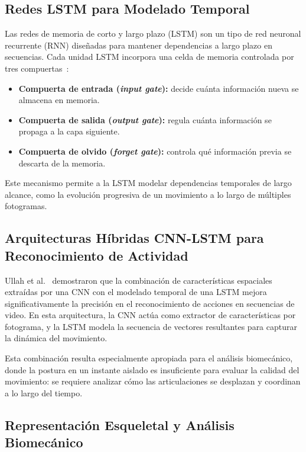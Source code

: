 \documentclass[conference]{IEEEtran}
\begin{document}
\subsection{Redes LSTM para Modelado Temporal}

Las redes de memoria de corto y largo plazo (LSTM) son un tipo de
red neuronal recurrente (RNN) diseñadas para mantener dependencias
a largo plazo en secuencias. Cada unidad LSTM incorpora una celda
de memoria controlada por tres compuertas~\cite{ullah2018action}:

\begin{itemize}
  \item \textbf{Compuerta de entrada (\textit{input gate}):}
        decide cuánta información nueva se almacena en memoria.
  \item \textbf{Compuerta de salida (\textit{output gate}):}
        regula cuánta información se propaga a la capa siguiente.
  \item \textbf{Compuerta de olvido (\textit{forget gate}):}
        controla qué información previa se descarta de la memoria.
\end{itemize}

Este mecanismo permite a la LSTM modelar dependencias temporales
de largo alcance, como la evolución progresiva de un movimiento
a lo largo de múltiples fotogramas.

\subsection{Arquitecturas Híbridas CNN-LSTM para Reconocimiento
            de Actividad}

Ullah et al.~\cite{ullah2018action} demostraron que la combinación
de características espaciales extraídas por una CNN con el modelado
temporal de una LSTM mejora significativamente la precisión en el
reconocimiento de acciones en secuencias de video. En esta
arquitectura, la CNN actúa como extractor de características por
fotograma, y la LSTM modela la secuencia de vectores resultantes
para capturar la dinámica del movimiento.

Esta combinación resulta especialmente apropiada para el análisis
biomecánico, donde la postura en un instante aislado es insuficiente
para evaluar la calidad del movimiento: se requiere analizar cómo
las articulaciones se desplazan y coordinan a lo largo del tiempo.

\subsection{Representación Esqueletal y Análisis Biomecánico}
\end{document}
